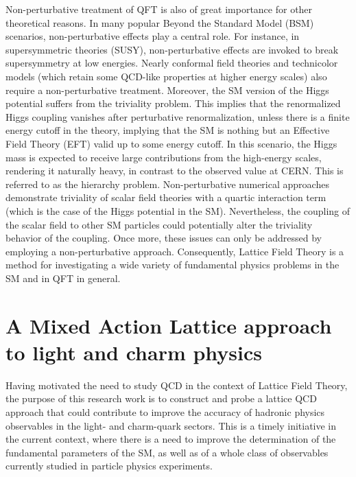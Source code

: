 Non-perturbative treatment of QFT is also of great importance for other theoretical reasons. In many popular Beyond the Standard Model (BSM) scenarios, non-perturbative effects play a central role. For instance, in supersymmetric theories (SUSY), non-perturbative effects are invoked to break supersymmetry at low energies. Nearly conformal field theories and technicolor models (which retain some QCD-like properties at higher energy scales) also require a non-perturbative treatment.  Moreover, the SM version of the Higgs potential suffers from the triviality problem. This implies that the renormalized Higgs coupling vanishes after perturbative renormalization, unless there is a finite energy cutoff in the theory, implying that the SM is nothing but an Effective Field Theory (EFT) valid up to some energy cutoff. In this scenario, the Higgs mass is expected to receive large contributions from the high-energy scales, rendering it naturally heavy, in contrast to the observed value at CERN. This is referred to as the hierarchy problem. Non-perturbative numerical approaches demonstrate triviality of scalar field theories with a quartic interaction term~\citep{Luscher:1987ek} (which is the case of the Higgs potential in the SM). Nevertheless, the coupling of the scalar field to other SM particles could potentially alter the triviality behavior of the coupling. Once more, these issues can only be addressed by employing a non-perturbative approach. Consequently, Lattice Field Theory is a method for investigating a wide variety of fundamental physics problems in the SM and in QFT in general.

\section*{A Mixed Action Lattice approach to light and charm physics}

Having motivated the need to study QCD in the context of Lattice Field Theory, the purpose of this research work is to construct and probe a lattice QCD approach that could contribute to improve the accuracy  of hadronic physics observables in the light- and charm-quark sectors. This is a timely initiative in the current context, where there is a need to improve the determination of the fundamental parameters of the SM, as well as of a whole class of observables currently studied in particle physics experiments. 


